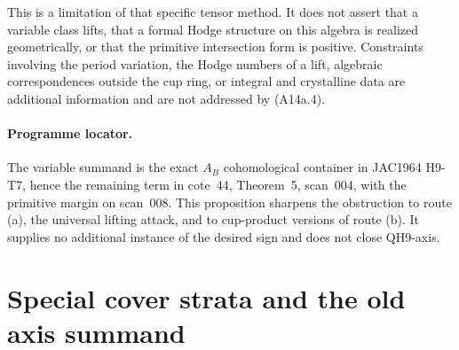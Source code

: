 \documentclass[11pt]{article}
\theoremstyle{remark}\newtheorem{remark}[theorem]{Remark}
\begin{document}
This is a limitation of that specific tensor method.
It does not assert that a variable class lifts, that a
formal Hodge structure on this algebra is realized
geometrically, or that the primitive intersection form is
positive. Constraints involving the period variation,
the Hodge numbers of a lift, algebraic correspondences
outside the cup ring, or integral and crystalline data
are additional information and are not addressed by
(A14a.4).

\paragraph{Programme locator.}
The variable summand is the exact $A_B$ cohomological
container in JAC1964 H9-T7, hence the remaining term in
cote~44, Theorem~5, scan~004, with the primitive margin
on scan~008. This proposition sharpens the obstruction
to route (a), the universal lifting attack, and to
cup-product versions of route (b). It supplies no
additional instance of the desired sign and does not
close QH9-axis.


\section{Special cover strata and the old axis summand}
\end{document}
